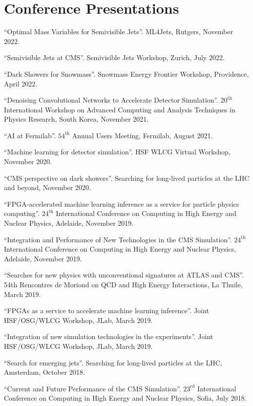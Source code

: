 \section{Conference Presentations}
\begin{description}[leftmargin=12pt,font=\normalfont,labelsep=0em]
\item ``Optimal Mass Variables for Semivisible Jets''. ML4Jets, Rutgers, November 2022.
\item ``Semivisible Jets at CMS''. Semivisible Jets Workshop, Zurich, July 2022.
\item ``Dark Showers for Snowmass''. Snowmass Energy Frontier Workshop, Providence, April 2022.
\item ``Denoising Convolutional Networks to Accelerate Detector Simulation''. $20^{\text{th}}$ International Workshop on Advanced Computing and Analysis Techniques in Physics Research, South Korea, November 2021.
\item ``AI at Fermilab''. $54^{\text{th}}$ Annual Users Meeting, Fermilab, August 2021.
\item ``Machine learning for detector simulation''. HSF WLCG Virtual Workshop, November 2020.
\item ``CMS perspective on dark showers''. Searching for long-lived particles at the LHC and beyond, November 2020.
\item ``FPGA-accelerated machine learning inference as a service for particle physics computing''. $24^{\text{th}}$ International Conference on Computing in High Energy and Nuclear Physics, Adelaide, November 2019.
\item ``Integration and Performance of New Technologies in the CMS Simulation''. $24^{\text{th}}$ International Conference on Computing in High Energy and Nuclear Physics, Adelaide, November 2019.
\item ``Searches for new physics with unconventional signatures at ATLAS and CMS''. 54th Rencontres de Moriond on QCD and High Energy Interactions, La Thuile, March 2019.
\item ``FPGAs as a service to accelerate machine learning inference''. Joint HSF/OSG/WLCG Workshop, JLab, March 2019.
\item ``Integration of new simulation technologies in the experiments''. Joint HSF/OSG/WLCG Workshop, JLab, March 2019.
\item ``Search for emerging jets''. Searching for long-lived particles at the LHC, Amsterdam, October 2018.
\item ``Current and Future Performance of the CMS Simulation''. $23^{\text{rd}}$ International Conference on Computing in High Energy and Nuclear Physics, Sofia, July 2018.

\end{description}
